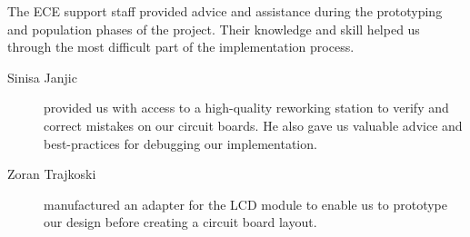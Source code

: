 The ECE support staff provided advice and assistance during the prototyping and population phases of the project. Their knowledge and skill helped us through the most difficult part of the implementation process.

\begin{description}

\item[Sinisa Janjic] provided us with access to a high-quality reworking station to verify and correct mistakes on our circuit boards. He also gave us valuable advice and best-practices for debugging our implementation.

\item[Zoran Trajkoski] manufactured an adapter for the LCD module to enable us to prototype our design before creating a circuit board layout. 

\end{description}
